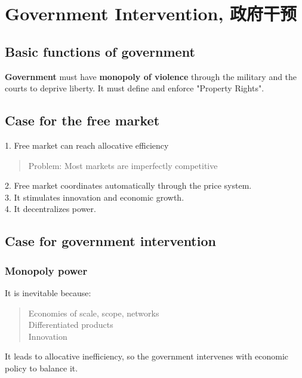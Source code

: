 \section{Government Intervention, 政府干预}
\subsection{Basic functions of government}
\textbf{Government} must have \textbf{monopoly of violence} through the military and the courts to deprive liberty. It must define and enforce "Property Rights".

\subsection{Case for the free market}
1. Free market can reach allocative efficiency
\begin{quote}
    Problem: Most markets are imperfectly competitive
\end{quote}
2. Free market coordinates automatically through the price system. \\
3. It stimulates innovation and economic growth. \\
4. It decentralizes power.

\subsection{Case for government intervention}
\subsubsection{Monopoly power}
It is inevitable because:
\begin{quote}
    Economies of scale, scope, networks \\
    Differentiated products \\
    Innovation
\end{quote}
It leads to allocative inefficiency, so the government intervenes with economic policy to balance it.

